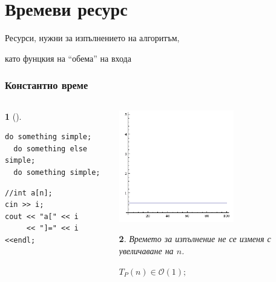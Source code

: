 \documentclass{beamer}
\newtheorem*{remark}{}
\begin{document}
\section{Времеви ресурс}


\begin{frame}
\centerline{Ресурси, нужни за изпълнението на алгоритъм,}
\centerline{като фунцкия на ``обема'' на входа}
\end{frame}



\begin{frame}[fragile]
\frametitle{Константно време}


\begin{columns}[t]
  \begin{column}{0.6\textwidth}
\begin{remark}[]
  \begin{lstlisting}[mathescape]
  do something simple;
  do something else simple;
  do something simple;
  \end{lstlisting}
\end{remark}

\begin{flushleft}
\begin{lstlisting}
//int a[n];
cin >> i;
cout << "a[" << i 
     << "]=" << i <<endl;
\end{lstlisting}
\end{flushleft}


  \end{column}
  \begin{column}{0.4\textwidth}

   \includegraphics[width=5cm]{images/constantf}
    \begin{flushleft}
    \begin{remark}
      Времето за изпълнение не се изменя с увеличаване на $n$.

      $T_P(n) \in \mathcal{O}(1);$
    \end{remark}
      
    \end{flushleft}


  \end{column}
\end{columns}




\end{frame}
\end{document}
